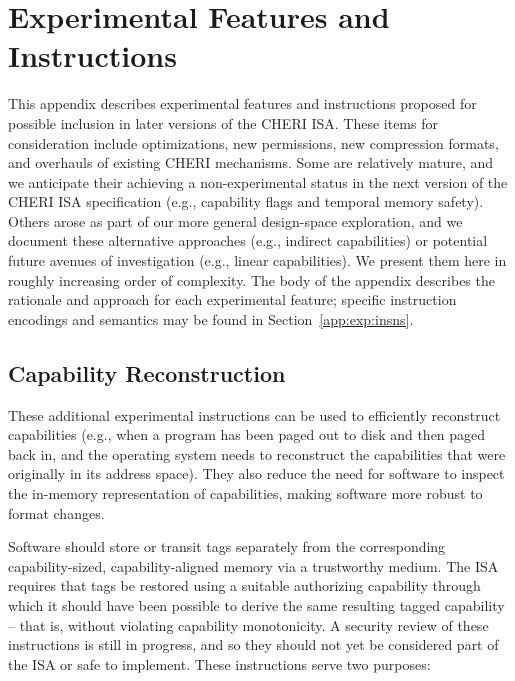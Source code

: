 \chapter{Experimental Features and Instructions}
\label{app:experimental}

This appendix describes experimental features and instructions proposed for
possible inclusion in later versions of the CHERI ISA.
These items for consideration include optimizations, new permissions, new
compression formats, and overhauls of existing CHERI mechanisms.
Some are relatively mature, and we anticipate their achieving a
non-experimental status in the next version of the CHERI ISA specification
(e.g., capability flags and temporal memory safety).
Others arose as part of our more general design-space exploration, and we
document these alternative approaches (e.g., indirect capabilities) or
potential future avenues of investigation (e.g., linear capabilities).
We present them here in roughly increasing order of complexity.
The body of the appendix describes the rationale and approach for each
experimental feature; specific instruction encodings and semantics may be
found in Section~\ref{app:exp:insns}.

\section{Capability Reconstruction} %
\label{section:capability-reconstruction}

These additional experimental instructions can be used to efficiently
reconstruct capabilities (e.g., when a program has been paged out to disk
and then paged back in, and the operating system needs to reconstruct the
capabilities that were originally in its address space).
They also reduce the need for software to inspect the in-memory representation
of capabilities, making software more robust to format changes.

Software should store or transit tags separately from the corresponding
capa\-bility-sized, capa\-bility-aligned memory via a trustworthy medium.
The ISA requires that tags be restored using a suitable authorizing capability
through which it should have been possible to derive the same resulting tagged
capability -- that is, without violating capability monotonicity.
A security review of these instructions is still in progress, and so they
should not yet be considered part of the ISA or safe to implement.
These instructions serve two purposes:

